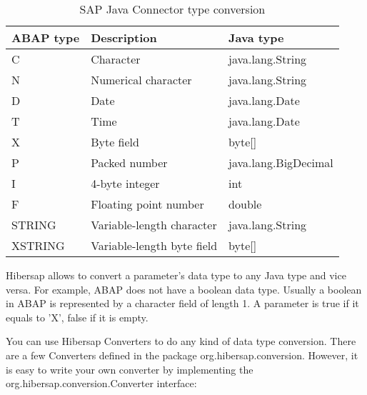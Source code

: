 \begin{table}[H]
  \centering
  \begin{tabular}{lll} \toprule
    \textbf{ABAP type} & \textbf{Description}       & \textbf{Java type} \\ \midrule
    C                  & Character                  & java.lang.String \\
    N                  & Numerical character        & java.lang.String \\
    D                  & Date                       & java.lang.Date \\
    T                  & Time                       & java.lang.Date \\
    X                  & Byte field                 & byte[] \\
    P                  & Packed number              & java.lang.BigDecimal \\
    I                  & 4-byte integer             & int \\
    F                  & Floating point number      & double \\
    STRING             & Variable-length character  & java.lang.String \\
    XSTRING            & Variable-length byte field & byte[] \\ \bottomrule
  \end{tabular}
  \caption{SAP Java Connector type conversion}
  \label{tab:JCoConversion}
\end{table}

Hibersap allows to convert a parameter's data type to any Java type and vice versa. For example, ABAP does not have a boolean data type. Usually a boolean in ABAP is represented by a character field of length 1. A parameter is true if it equals to 'X', false if it is empty.

You can use Hibersap Converters to do any kind of data type conversion. There are a few Converters defined in the package org.hibersap.conversion. However, it is easy to write your own converter by implementing the org.hibersap.conversion.Converter interface:

